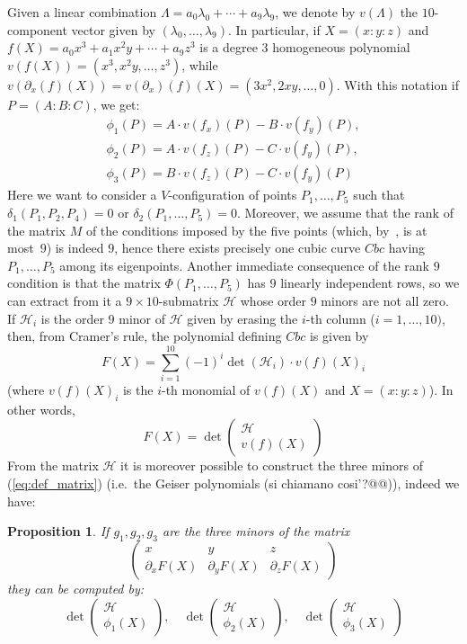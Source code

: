 \documentclass[11pt, a4paper, reqno, captions=tableheading,bibliography=totoc]{scrartcl}
\theoremstyle{plain}
\newtheorem{prop}[lemma]{Proposition}
\theoremstyle{definition}
\newcommand{\de}{\partial}
\newcommand{\cbc}{\ensuremath{Cbc}}
\begin{document}
Given a linear combination $\Lambda = a_0\lambda_0+\cdots+a_9\lambda_9$, we
denote by $v(\Lambda)$ the $10$-component vector given by
$(\lambda_0, \dots, \lambda_9)$. In particular, if $X=(x: y: z)$ and
$f(X) = a_0x^3+a_1x^2y+\cdots+ a_9z^3$ is a degree $3$ homogeneous polynomial
$v(f(X)) = (x^3, x^2y, \dots, z^3)$, while $v(\de_x(f)(X)) = v(\de_x)(f)(X) =%
(3x^2, 2xy, \dots, 0)$. With this notation if $P=(A: B: C)$, we get:
%
\begin{gather*}
\phi_1(P) = A\cdot v(f_x)(P)-B\cdot v(f_y)(P), \\
\phi_2(P) = A\cdot v(f_z)(P)-C\cdot v(f_y)(P),\\
\phi_3(P) = B\cdot v(f_z)(P)-C\cdot v(f_y)(P) 
\end{gather*}
%
Here we want to consider a $V$-configuration of points $P_1, \dots, P_5$
such that $\delta_1(P_1, P_2, P_4) = 0$ or $\delta_2(P_1, \dots, P_5) = 0$.
Moreover, we assume that the rank of the matrix $M$
of the conditions imposed by
the five points (which, by~, is at most~$9$)
is indeed $9$, hence there exists precisely one cubic curve $\cbc$ having
$P_1, \dots, P_5$ among its eigenpoints. Another immediate consequence of
the rank $9$ condition is that the
matrix $\Phi(P_1, \dots, P_5)$ has $9$ linearly independent rows, so
we can extract from it a  $9 \times 10$-submatrix
$\mathcal{H}$ whose order $9$ minors are not all zero. If
$\mathcal{H}_i$ is the order $9$ minor of
$\mathcal{H}$ given by erasing the $i$-th column ($i=1, \dots, 10)$, then,
from Cramer's rule, the polynomial defining $\cbc$ is given by
\[
 F(X) = \sum_{i=1}^{10}(-1)^i\det(\mathcal{H}_i)\cdot v(f)(X)_i
\]
(where $v(f)(X)_i$ is the $i$-th monomial of $v(f)(X)$
and $X=(x: y: z)$). In other words,
\[
F(X) = \det \left( \begin{array}{c} \mathcal{H}\\ v(f)(X)
 \end{array} \right)
\]
From the matrix $\mathcal{H}$ it is moreover possible to construct 
the three minors of (\ref{eq:def_matrix}) (i.e.\ the Geiser polynomials
(si chiamano cosi'?@@)), indeed we have:
\begin{prop}
\label{proposition:geiser1}
If $g_1, g_2, g_3$ are the three minors of the matrix 
\[
\left(
\begin{array}{ccc}
x & y & z \\
\de_xF(X) & \de_yF(X) & \de_z F(X)
\end{array}
\right)
\]
they can be computed by:
\[
\det \left( \begin{array}{c} \mathcal{H}\\ 
\phi_1(X)
\end{array} \right),\quad
\det \left( \begin{array}{c} \mathcal{H}\\ 
\phi_2(X)
\end{array} \right), \quad
\det \left( \begin{array}{c} \mathcal{H}\\ 
\phi_3(X)
\end{array} \right)
\]
\end{prop}
\end{document}
